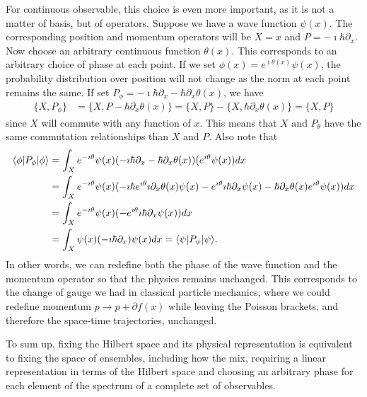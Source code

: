 For continuous observable, this choice is even more important, as it is not a matter of basis, but of operators. Suppose we have a wave function $\psi(x)$. The corresponding position and momentum operators will be $X=x$ and $P=-\imath \hbar \partial_x$. Now choose an arbitrary continuous function $\theta(x)$. This corresponds to an arbitrary choice of phase at each point. If we set $\phi(x) = e^{\imath \theta(x)} \psi(x)$, the probability distribution over position will not change as the norm at each point remains the same. If set $P_{\phi} = -\imath \hbar \partial_x - \hbar \partial_x \theta(x)$, we have
\begin{equation}
	\begin{aligned}
		\{X, P_{\phi}\} &= \{X, P - \hbar \partial_x \theta(x)\} = \{X, P \} - \{X, \hbar \partial_x \theta(x)\} = \{X, P \}
	\end{aligned}
\end{equation}
since $X$ will commute with any function of $x$. This means that $X$ and $P_{\theta}$ have the same commutation relationships than $X$ and $P$. Also note that
\begin{equation}
	\begin{aligned}
		\langle\phi | P_{\phi} | \phi \rangle & = \int_X e^{ - \imath \theta} \psi(x) (-\imath \hbar \partial_x - \hbar \partial_x  \theta(x) )(e^{ \imath \theta} \psi(x)) dx \\
		& = \int_X e^{ - \imath \theta} \psi(x) (-\imath \hbar e^{ \imath \theta} \imath \partial_x \theta(x)  \psi(x) - e^{ \imath \theta} \imath \hbar \partial_x\psi(x)  - \hbar \partial_x  \theta(x) e^{ \imath \theta} \psi(x)) dx \\
		& = \int_X e^{ - \imath \theta} \psi(x) (- e^{ \imath \theta} \imath \hbar \partial_x\psi(x) ) dx \\
		& = \int_X \psi(x) (- \imath \hbar \partial_x )\psi(x)  dx  = \langle\psi | P_{\psi} | \psi \rangle.
	\end{aligned}
\end{equation}
In other words, we can redefine both the phase of the wave function and the momentum operator so that the physics remains unchanged. This corresponds to the change of gauge we had in classical particle mechanics, where we could redefine momentum $p \to p + \partial f(x)$ while leaving the Poisson brackets, and therefore the space-time trajectories, unchanged.

To sum up, fixing the Hilbert space and its physical representation is equivalent to fixing the space of ensembles, including how the mix, requiring a linear representation in terms of the Hilbert space and choosing an arbitrary phase for each element of the spectrum of a complete set of observables.

